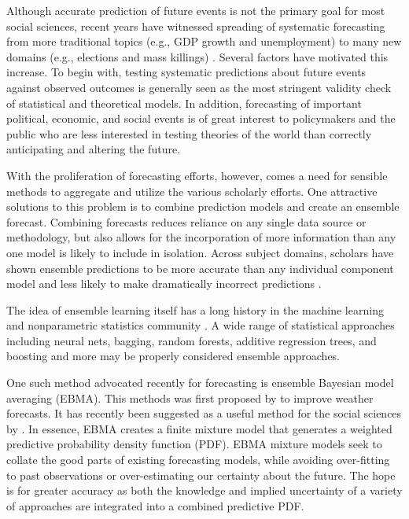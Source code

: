 \documentclass[12pt,fullpage,endnotes]{article}
\begin{document}
Although accurate prediction of future events is not the primary goal
for most social sciences, recent years have witnessed spreading of
systematic forecasting from more traditional topics (e.g., GDP growth
and unemployment) to many new domains (e.g., elections and mass
killings) .  Several factors have motivated this increase.  To begin
with, testing systematic predictions about future events against
observed outcomes is generally seen as the most stringent validity
check of statistical and theoretical models.  In addition, forecasting
of important political, economic, and social events is of great
interest to policymakers and the public who are less interested in
testing theories of the world than correctly anticipating and altering
the future.

With the proliferation of forecasting efforts, however, comes a need
for sensible methods to aggregate and utilize the various scholarly
efforts.  One attractive solutions to this problem is to combine
prediction models and create an ensemble forecast.  Combining
forecasts reduces reliance on any single data source or methodology,
but also allows for the incorporation of more information than any one
model is likely to include in isolation.  Across subject domains,
scholars have shown ensemble predictions to be more accurate than any
individual component model and less likely to make dramatically
incorrect predictions \citep{Bates:1969,Armstrong:2001,Raftery:2005}.

The idea of ensemble learning itself has a long history in the machine
learning and nonparametric statistics community \citep{Hastie:2009}. A
wide range of statistical approaches including neural nets, bagging,
random forests, additive regression trees, and boosting and more may
be properly considered ensemble approaches.

One such method advocated recently for forecasting is ensemble
Bayesian model averaging (EBMA). This methods was first proposed by
\citet{Raftery:2005} to improve weather forecasts.  It has recently
been suggested as a useful method for the social sciences by
\citet{mhw:2012}. In essence, EBMA creates a finite mixture model that
generates a weighted predictive probability density function (PDF).
EBMA mixture models seek to collate the good parts of existing
forecasting models, while avoiding over-fitting to past observations
or over-estimating our certainty about the future.  The hope is for
greater accuracy as both the knowledge and implied uncertainty of a
variety of approaches are integrated into a combined predictive PDF.
\end{document}
